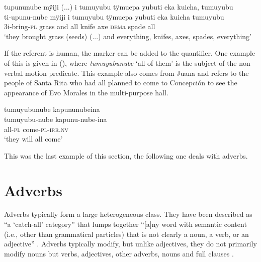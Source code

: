 \ea\label{ex:tumuyubu-2}
\begingl
\glpreamble tupununube mÿiji (...) i tumuyubu tÿmuepa yubuti eka kuicha, tumuyubu\\
\gla ti-upunu-nube mÿiji i tumuyubu tÿmuepa yubuti eka kuicha tumuyubu\\
\glb 3i-bring-\textsc{pl} grass and all knife axe \textsc{dem}a spade all\\
\glft ‘they brought grass (seeds) (...) and everything, knifes, axes, spades, everything’
\endgl
\trailingcitation{[jxx-p120515l-2.036-039]}
\xe

If the referent is human, the  marker can be added to the quantifier. One example of this is given in (), where \textit{tumuyubunube} ‘all of them’ is the subject of the non-verbal motion predicate. This example also comes from Juana and refers to the people of Santa Rita who had all planned to come to Concepción to see the appearance of Evo Morales in the multi-purpose hall.

\ea\label{ex:tumuyubu-1}
\begingl
\glpreamble tumuyubunube kapununubeina\\
\gla tumuyubu-nube kapunu-nube-ina\\
\glb all-\textsc{pl} come-\textsc{pl}-\textsc{irr.nv}\\
\glft ‘they will all come’
\endgl
\trailingcitation{[jxx-p150920l.079]}
\xe



This was the last example of this section, the following one deals with adverbs.





















\section{Adverbs}\label{sec:Adverbs}

Adverbs typically form a large heterogeneous class. They have been described as “a ‘catch-all’ category” that lumps together “[a]ny word with semantic content (i.e., other than grammatical particles) that is not clearly a noun, a verb, or an adjective” \citep[69]{Payne1997}. Adverbs typically modify, but unlike adjectives, they do not primarily modify nouns but verbs, adjectives, other adverbs, nouns and full clauses \citep[715]{Evans2000}.

